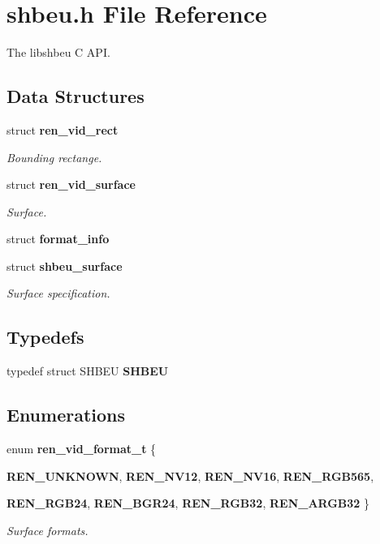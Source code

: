 \section{shbeu.h File Reference}
\label{shbeu_8h}


The libshbeu C API.  


\subsection*{Data Structures}
\begin{DoxyCompactItemize}
\item 
struct {\bf ren\_\-vid\_\-rect}
\begin{DoxyCompactList}\small\item\em Bounding rectange. \item\end{DoxyCompactList}\item 
struct {\bf ren\_\-vid\_\-surface}
\begin{DoxyCompactList}\small\item\em Surface. \item\end{DoxyCompactList}\item 
struct {\bf format\_\-info}
\item 
struct {\bf shbeu\_\-surface}
\begin{DoxyCompactList}\small\item\em Surface specification. \item\end{DoxyCompactList}\end{DoxyCompactItemize}
\subsection*{Typedefs}
\begin{DoxyCompactItemize}
\item 
typedef struct SHBEU {\bfseries SHBEU}\label{shbeu_8h_a68a5adf8b25a239b16c3e21128cde170}

\end{DoxyCompactItemize}
\subsection*{Enumerations}
\begin{DoxyCompactItemize}
\item 
enum {\bf ren\_\-vid\_\-format\_\-t} \{ \par
{\bfseries REN\_\-UNKNOWN}, 
{\bf REN\_\-NV12}, 
{\bf REN\_\-NV16}, 
{\bf REN\_\-RGB565}, 
\par
{\bf REN\_\-RGB24}, 
{\bf REN\_\-BGR24}, 
{\bf REN\_\-RGB32}, 
{\bf REN\_\-ARGB32}
 \}
\begin{DoxyCompactList}\small\item\em Surface formats. \item\end{DoxyCompactList}\end{DoxyCompactItemize}
